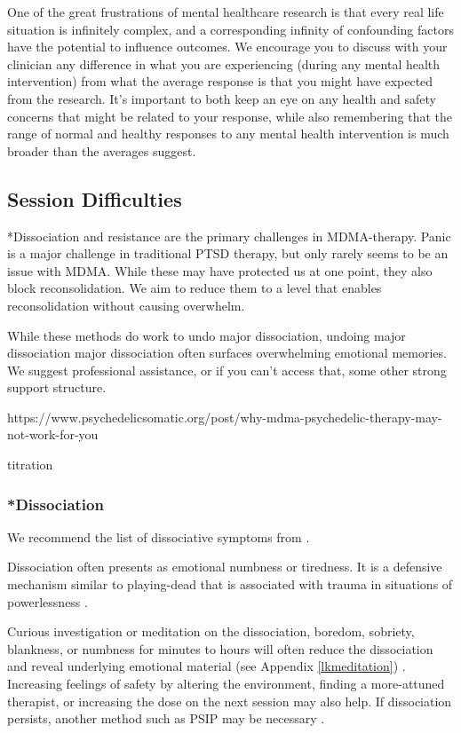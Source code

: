 \documentclass[12pt,letterpaper]{article}
\begin{document}
One of the great frustrations of mental healthcare research is that every real life situation is infinitely complex, and a corresponding infinity of confounding factors have the potential to influence outcomes. We encourage you to discuss with your clinician any difference in what you are experiencing (during any mental health intervention) from what the average response is that you might have expected from the research. It's important to both keep an eye on any health and safety concerns that might be related to your response, while also remembering that the range of normal and healthy responses to any mental health intervention is much broader than the averages suggest.
\subsection{Session Difficulties}
\label{sec:dissociationandresistance}
*Dissociation and resistance are the primary challenges in MDMA-therapy. Panic is a major challenge in traditional PTSD therapy, but only rarely seems to be an issue with MDMA. While these may have protected us at one point, they also block reconsolidation. We aim to reduce them to a level that enables reconsolidation without causing overwhelm.

While these methods do work to undo major dissociation, undoing major dissociation major dissociation often surfaces overwhelming emotional memories. We suggest professional assistance, or if you can't access that, some other strong support structure.

https://www.psychedelicsomatic.org/post/why-mdma-psychedelic-therapy-may-not-work-for-you

titration

\subsubsection{*Dissociation}

We recommend the list of dissociative symptoms from \textcite{cheetahSigns}.

Dissociation often presents as emotional numbness or tiredness. It is a defensive mechanism similar to playing-dead that is associated with trauma in situations of powerlessness \cite{loewensteinDissociation}.

Curious investigation or meditation on the dissociation, boredom, sobriety, blankness, or numbness for minutes to hours will often reduce the dissociation and reveal underlying emotional material (see Appendix \ref{lkmeditation}) \cite{razviPSIP}.  Increasing feelings of safety by altering the environment, finding a more-attuned therapist, or increasing the dose on the next session may also help. If dissociation persists, another method such as PSIP may be necessary \cite{razviPSIP}.
\end{document}
